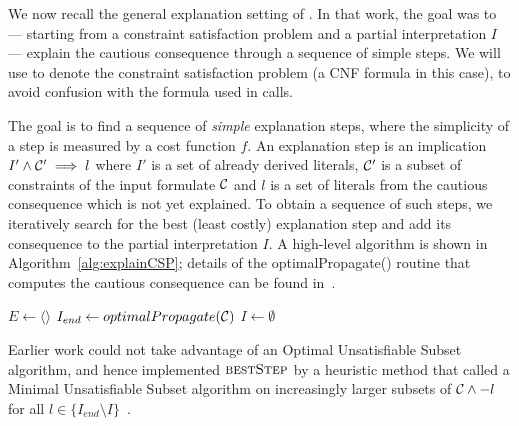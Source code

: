 
We now recall the general explanation setting of \citet{ecai/BogaertsGCG20}. 
In that work, the goal was to --- starting from a constraint satisfaction problem and a partial interpretation $I$ --- explain the cautious consequence through a sequence of simple steps. 
We will use \formulac to denote the constraint satisfaction problem (a CNF formula in this case), to avoid confusion with the formula \formula used in \omus calls.

The goal is to find a sequence of \textit{simple} explanation steps, where the simplicity of a step is measured by a cost function $f$. 
An explanation step is an implication $I' \wedge \mathcal{C} ' \implies l$ where $I'$ is a set of already derived literals, $\mathcal{C} '$ is a subset of constraints of the input formulate $\mathcal{C} $ and $l$ is a set of literals from the cautious consequence which is not yet explained.
To obtain a sequence of such steps, we iteratively search for the best (least costly) explanation step and add its consequence to the partial interpretation $I$. A high-level algorithm is shown in Algorithm~\ref{alg:explainCSP}; details of the optimalPropagate() routine that computes the cautious consequence can be found in~\cite{ecai/BogaertsGCG20}.

\begin{algorithm}[ht]
  \caption{$\call{ExplainCSP}(\formulac,f)$}
  \label{alg:explainCSP}
$E \gets \langle \rangle$\;
$I_{end} \gets optimalPropagate(\mathcal{C} )$\;
$I \gets \emptyset$\;
\;
\end{algorithm}

Earlier work could not take advantage of an Optimal Unsatisfiable Subset algorithm, and hence implemented $\textsc{bestStep}$ by a heuristic method that called a Minimal Unsatisfiable Subset algorithm on increasingly larger subsets of $\mathcal{C}  \wedge -l$ for all $l \in \{I_{end} \setminus I\}$~\cite{ecai/BogaertsGCG20}.


